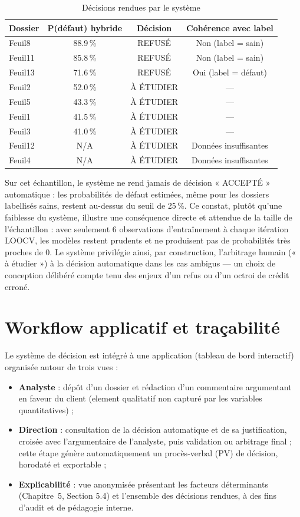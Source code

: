 \begin{table}[h]
\centering
\small
\begin{tabular}{@{}lccc@{}}
\toprule
\textbf{Dossier} & \textbf{P(défaut) hybride} & \textbf{Décision} & \textbf{Cohérence avec label} \\
\midrule
Feuil8  & 88.9\,\% & REFUSÉ & Non (label = sain) \\
Feuil11 & 85.8\,\% & REFUSÉ & Non (label = sain) \\
Feuil13 & 71.6\,\% & REFUSÉ & Oui (label = défaut) \\
Feuil2  & 52.0\,\% & À ÉTUDIER & — \\
Feuil5  & 43.3\,\% & À ÉTUDIER & — \\
Feuil1  & 41.5\,\% & À ÉTUDIER & — \\
Feuil3  & 41.0\,\% & À ÉTUDIER & — \\
Feuil12 & N/A & À ÉTUDIER & Données insuffisantes \\
Feuil4  & N/A & À ÉTUDIER & Données insuffisantes \\
\bottomrule
\end{tabular}
\caption{Décisions rendues par le système}
\label{tab:decisions}
\end{table}

Sur cet échantillon, le système ne rend jamais de décision « ACCEPTÉ » automatique : les
probabilités de défaut estimées, même pour les dossiers labellisés sains, restent au-dessus du
seuil de 25\,\%. Ce constat, plutôt qu'une faiblesse du système, illustre une conséquence directe
et attendue de la taille de l'échantillon : avec seulement 6 observations d'entraînement à
chaque itération LOOCV, les modèles restent prudents et ne produisent pas de probabilités très
proches de 0. Le système privilégie ainsi, par construction, l'arbitrage humain (« à étudier »)
à la décision automatique dans les cas ambigus — un choix de conception délibéré compte tenu des
enjeux d'un refus ou d'un octroi de crédit erroné.

\section{Workflow applicatif et traçabilité}

Le système de décision est intégré à une application (tableau de bord interactif) organisée
autour de trois vues :

\begin{itemize}
    \item \textbf{Analyste} : dépôt d'un dossier et rédaction d'un commentaire argumentant en
    faveur du client (element qualitatif non capturé par les variables quantitatives) ;
    \item \textbf{Direction} : consultation de la décision automatique et de sa justification,
    croisée avec l'argumentaire de l'analyste, puis validation ou arbitrage final ; cette étape
    génère automatiquement un procès-verbal (PV) de décision, horodaté et exportable ;
    \item \textbf{Explicabilité} : vue anonymisée présentant les facteurs déterminants
    (Chapitre~5, Section 5.4) et l'ensemble des décisions rendues, à des fins d'audit et de
    pédagogie interne.
\end{itemize}

